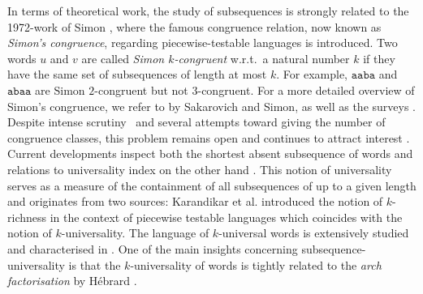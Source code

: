 \documentclass[runningheads,UKenglish,cleveref, autoref, thm-restate]{llncs}
\newcommand{\N}{\mathbb{N}}
\DeclareMathOperator\ScatFact{SubSeq}
\begin{document}
In terms of theoretical work, the study of subsequences is strongly related to the 1972-work of Simon \cite{simon1972hierarchies}, where the famous congruence relation, now known as \emph{Simon's congruence}, regarding piecewise-testable languages is introduced. Two words $u$ and $v$ are called \emph{Simon $k$-congruent} w.r.t.~a natural number $k$ if they have the same set of subsequences of length at most $k$. For example, $\mathtt{aaba}$ and $\mathtt{abaa}$ are Simon $2$-congruent but not $3$-congruent.
For a more detailed overview of Simon's congruence, we refer to \cite[Chapter 6]{lothaire} by Sakarovich and Simon, as well as the surveys \cite{pin2019influence,Kosche2022SubsequenceSurvey}. Despite intense scrutiny~\cite{DBLP:conf/mfcs/FleischerK18,DBLP:conf/stacs/GawrychowskiKKM21} and several attempts toward giving the number of congruence classes,  this problem remains open and continues to attract interest \cite{DBLP:conf/fct/FleischmannHHN23,DBLP:conf/rp/FleischmannKKMNSW23,DBLP:journals/tcs/KimHKS23,DBLP:conf/dlt/KimHKS23,DBLP:journals/tcs/KimKH24}. Current developments inspect both the shortest absent subsequence of words \cite{DBLP:journals/fuin/KoscheKMS22} and relations to universality index on the other hand \cite{DBLP:conf/dlt/BarkerFHMN20,DBLP:conf/stacs/DayFKKMS21}. This notion of universality serves as a measure of the containment of all subsequences of up to a given length and originates from two sources: Karandikar et al. \cite{DBLP:journals/ipl/KarandikarKS15} introduced the notion of $k$-richness in the context of piecewise testable languages \cite{katai2012word,pach2018normal} 
which coincides with the notion of $k$-universality. The language of $k$-universal words is extensively studied and characterised in \cite{DBLP:conf/isaac/AdamsonFHKMN23,DBLP:conf/dlt/BarkerFHMN20,DBLP:conf/stacs/DayFKKMS21,DBLP:journals/tcs/Hebrard91}. 
One of the main insights concerning subsequence-universality is that the $k$-universality of words is tightly related to the {\em arch factorisation} by Hébrard   \cite{DBLP:journals/tcs/Hebrard91}.
\end{document}
